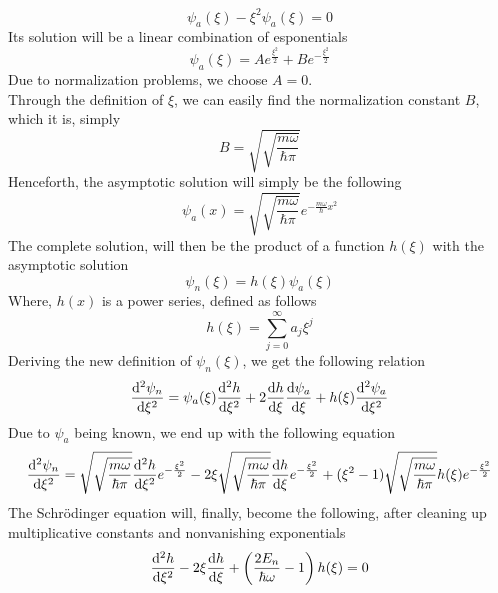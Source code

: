 \documentclass[../qm.tex]{subfiles}
\begin{document}
	\begin{equation*}
		\psi_a(\xi)-\xi^2\psi_a(\xi)=0
	\end{equation*}
	Its solution will be a linear combination of esponentials
	\begin{equation*}
		\psi_a(\xi)=Ae^{\frac{\xi^2}{2}}+Be^{-\frac{\xi^2}{2}}
	\end{equation*}
	Due to normalization problems, we choose $A=0$.\\
	Through the definition of $\xi$, we can easily find the normalization constant $B$, which it is, simply
	\begin{equation*}
		B=\sqrt{\sqrt{\frac{m\omega}{\hbar\pi}}}
	\end{equation*}
	Henceforth, the asymptotic solution will simply be the following
	\begin{equation}
		\psi_a(x)=\sqrt{\sqrt{\frac{m\omega}{\hbar\pi}}}e^{-\frac{m\omega}{\hbar}x^2}
		\label{eq:schrqhoasy}
	\end{equation}
	The complete solution, will then be the product of a function $h(\xi)$ with the asymptotic solution
	\begin{equation}
		\psi_n(\xi)=h(\xi)\psi_a(\xi)
		\label{eq:solcomplete}
	\end{equation}
	Where, $h(x)$ is a power series, defined as follows
	\begin{equation}
		h(\xi)=\sum_{j=0}^{\infty}a_j\xi^j
		\label{eq:hxischrqho}
	\end{equation}
	Deriving the new definition of $\psi_n(\xi)$, we get the following relation
	\begin{equation*}
		\derivative[2]{\psi_n}{\xi}=\psi_a(\xi)\derivative[2]{h}{\xi}+2\derivative{h}{\xi}\derivative{\psi_a}{\xi}+h(\xi)\derivative[2]{\psi_a}{\xi}
	\end{equation*}
	Due to $\psi_a$ being known, we end up with the following equation
	\begin{equation*}
		\derivative[2]{\psi_n}{\xi}=\sqrt{\sqrt{\frac{m\omega}{\hbar\pi}}}\derivative[2]{h}{\xi}e^{-\frac{\xi^2}{2}}-2\xi\sqrt{\sqrt{\frac{m\omega}{\hbar\pi}}}\derivative{h}{\xi}e^{-\frac{\xi^2}{2}}+(\xi^2-1)\sqrt{\sqrt{\frac{m\omega}{\hbar\pi}}}h(\xi)e^{-\frac{\xi^2}{2}}
	\end{equation*}
	The Schrödinger equation will, finally, become the following, after cleaning up multiplicative constants and nonvanishing exponentials
	\begin{equation}
		\derivative[2]{h}{\xi}-2\xi\derivative{h}{\xi}+\left( \frac{2E_n}{\hbar\omega}-1 \right)h(\xi)=0
		\label{eq:schrqhohxi}
	\end{equation}
\end{document}
